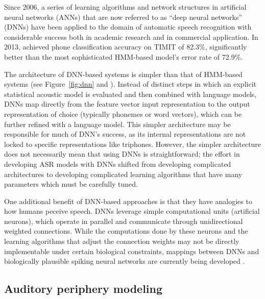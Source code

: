 Since 2006, a series of learning algorithms
and network structures in artificial neural networks (ANNs)
that are now referred to as ``deep neural networks'' (DNNs)
have been applied to
the domain of automatic speech recognition
with considerable success
both in academic research
and in commercial application.
In 2013, \citet{graves2013}
achieved
phone classification accuracy on TIMIT
of 82.3\%,
significantly better than the most sophisticated
HMM-based model's error rate of 72.9\%.  %

The architecture of DNN-based systems
is simpler than that of HMM-based systems
(see Figure~\ref{fig:dnn}
and \citealt{hinton2012}).
Instead of distinct steps in which
an explicit statistical acoustic model
is evaluated and then combined with language models,
DNNs map directly from the
feature vector input representation
to the output representation of choice
(typically phonemes or word vectors),
which can be further refined with a language model.
This simpler architecture may be
responsible for much of DNN's success,
as its internal representations
are not locked to specific representations
like triphones.
However, the simpler architecture
does not necessarily mean that
using DNNs is straightforward;
the effort in developing ASR models
with DNNs shifted from
developing complicated architectures
to developing complicated learning algorithms
that have many parameters
which must be carefully tuned.


One additional benefit of DNN-based approaches
is that they have analogies to
how humans peceive speech.
DNNs leverage simple computational units
(artificial neurons),
which operate in parallel
and communicate through unidirectional
weighted connections.
While the computations done by these neurons
and the learning algorithms that adjust
the connection weights
may not be directly implementable
under certain biological constraints,
mappings between DNNs
and biologically plausible spiking neural networks
are currently being developed
\citep{hunsberger2015}.

\subsection{Auditory periphery modeling}

